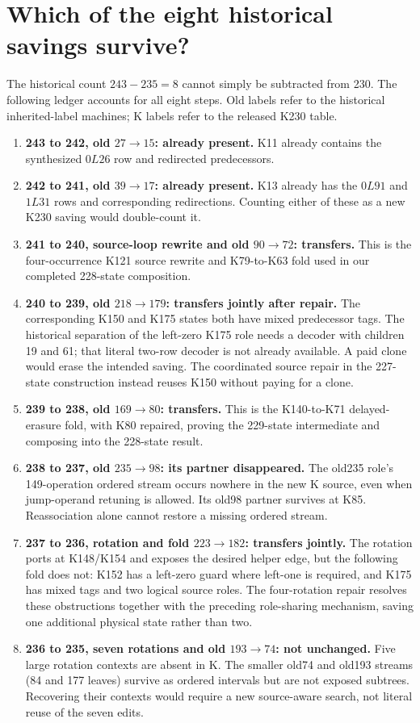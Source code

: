 \section{Which of the eight historical savings survive?}
The historical count $243-235=8$ cannot simply be subtracted from 230.
The following ledger accounts for all eight steps. Old labels refer to the
historical inherited-label machines; K labels refer to the released K230 table.
\begin{enumerate}
\item \textbf{243 to 242, old $27\to15$: already present.}
K11 already contains the synthesized $0L26$ row and redirected predecessors.
\item \textbf{242 to 241, old $39\to17$: already present.}
K13 already has the $0L91$ and $1L31$ rows and corresponding redirections.
Counting either of these as a new K230 saving would double-count it.
\item \textbf{241 to 240, source-loop rewrite and old $90\to72$: transfers.}
This is the four-occurrence K121 source rewrite and K79-to-K63 fold used in
our completed 228-state composition.
\item \textbf{240 to 239, old $218\to179$: transfers jointly after repair.}
The corresponding K150 and K175 states both have mixed predecessor tags.
The historical separation of the left-zero K175 role needs a decoder with
children 19 and 61; that literal two-row decoder is not already available.
A paid clone would erase the intended saving. The coordinated source repair
in the 227-state construction instead reuses K150 without paying for a clone.
\item \textbf{239 to 238, old $169\to80$: transfers.}
This is the K140-to-K71 delayed-erasure fold, with K80 repaired, proving the
229-state intermediate and composing into the 228-state result.
\item \textbf{238 to 237, old $235\to98$: its partner disappeared.}
The old235 role's 149-operation ordered stream occurs nowhere in the new K
source, even when jump-operand retuning is allowed. Its old98 partner survives
at K85. Reassociation alone cannot restore a missing ordered stream.
\item \textbf{237 to 236, rotation and fold $223\to182$: transfers jointly.}
The rotation ports at K148/K154 and exposes the desired helper edge, but the
following fold does not: K152 has a left-zero guard where left-one is required,
and K175 has mixed tags and two logical source roles. The four-rotation
repair resolves these obstructions together with the preceding role-sharing
mechanism, saving one additional physical state rather than two.
\item \textbf{236 to 235, seven rotations and old $193\to74$: not unchanged.}
Five large rotation contexts are absent in K. The smaller old74 and old193
streams (84 and 177 leaves) survive as ordered intervals but are not exposed
subtrees. Recovering their contexts would require a new source-aware search,
not literal reuse of the seven edits.
\end{enumerate}
